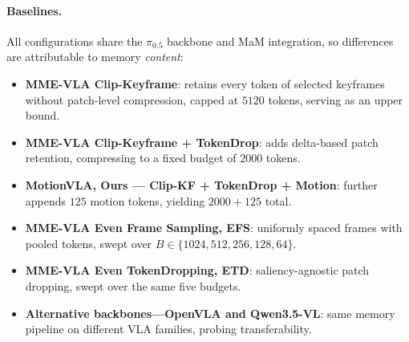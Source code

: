 \documentclass{article}
\begin{document}
\paragraph{Baselines.}
All configurations share the $\pi_{0.5}$ backbone and MaM integration,
so differences are attributable to memory \emph{content}:
\begin{itemize}
  \item \textbf{MME-VLA Clip-Keyframe}: retains every token of selected
        keyframes without patch-level compression, capped at $5120$ tokens, serving as an upper bound.
  \item \textbf{MME-VLA Clip-Keyframe + TokenDrop}: adds delta-based patch
        retention, compressing to a fixed budget of $2000$ tokens.
  \item \textbf{MotionVLA, Ours --- Clip-KF + TokenDrop + Motion}: further
        appends $125$ motion tokens, yielding $2000{+}125$ total.
  \item \textbf{MME-VLA Even Frame Sampling, EFS}: uniformly spaced
        frames with pooled tokens, swept over $B\!\in\!\{1024,512,256,128,64\}$.
  \item \textbf{MME-VLA Even TokenDropping, ETD}: saliency-agnostic patch
        dropping, swept over the same five budgets.
  \item \textbf{Alternative backbones---OpenVLA and Qwen3.5-VL}: same memory
        pipeline on different VLA families, probing transferability.
\end{itemize}
\end{document}
